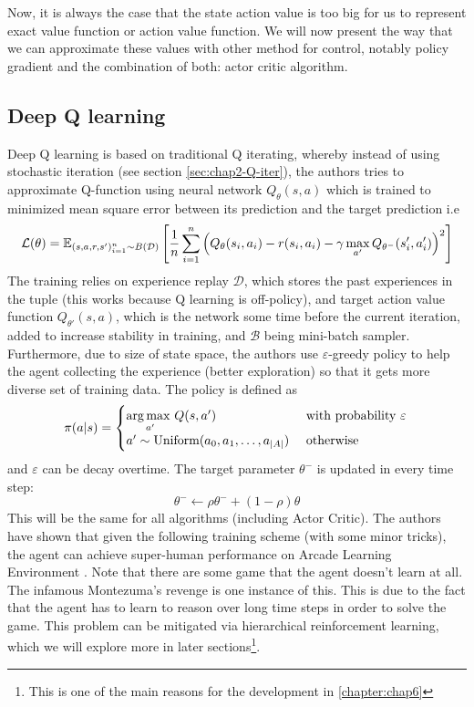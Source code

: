 \label{sec:chap2-deep-rl}
Now, it is always the case that the state action value is too big for us to represent exact value function or action value function. We will now present the way that we can approximate these values with other method for control, notably policy gradient and the combination of both: actor critic algorithm.

\subsection{Deep Q learning \cite{mnih2015human}}
Deep Q learning is based on traditional Q iterating, whereby instead of using stochastic iteration (see section \ref{sec:chap2-Q-iter}), the authors tries to approximate Q-function using neural network $Q_\theta(s, a)$ which is trained to minimized mean square error between its prediction and the target prediction i.e
\begin{equation}
    \mathcal{L}(\theta) = \mathbb{E}_{(s, a, r, s')^n_{i=1} \sim B(\mathcal{D})}\left[  \frac{1}{n}\sum^n_{i=1} \left( Q_{\theta}(s_i, a_i) - r(s_i, a_i) - \gamma\max_{a'} Q_{\theta^-}(s'_i, a'_i) \right)^2  \right]
\end{equation}
The training relies on experience replay $\mathcal{D}$, which stores the past experiences in the tuple (this works because Q learning is off-policy), and target action value function $Q_{\theta'}(s, a)$, which is the network some time before the current iteration, added to increase stability in training, and $\mathcal{B}$ being mini-batch sampler. Furthermore, due to size of state space, the authors use $\varepsilon$-greedy policy to help the agent collecting the experience (better exploration) so that it gets more diverse set of training data. The policy is defined as
\begin{equation}
    \pi(a | s) = \begin{cases}
        \underset{a'}{\arg\max \ } Q(s, a') &\text{ with probability } \varepsilon \\
        a' \sim \text{Uniform}(a_0, a_1, \dots, a_{|A|}) &\text{ otherwise } \\
    \end{cases} \\
\end{equation}
and $\varepsilon$ can be decay overtime. The target parameter $\theta^-$ is updated in every time step:
\begin{equation}
\label{eqn:chap2-update-target}
    \theta^- \leftarrow \rho \theta^- + (1-\rho) \theta
\end{equation}
This will be the same for all algorithms (including Actor Critic). The authors have shown that given the following training scheme (with some minor tricks), the agent can achieve super-human performance on Arcade Learning Environment \cite{bellemare2013arcade}. Note that there are some game that the agent doesn't learn at all. The infamous Montezuma's revenge is one instance of this. This is due to the fact that the agent has to learn to reason over long time steps in order to solve the game. This problem can be mitigated via hierarchical reinforcement learning, which we will explore more in later sections\footnote{This is one of the main reasons for the development in \ref{chapter:chap6}}.

